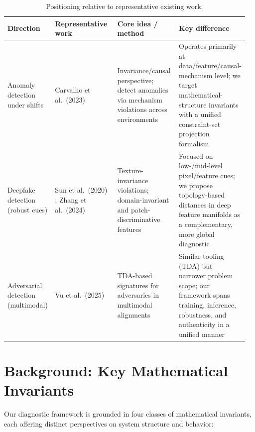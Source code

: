\documentclass[11pt]{article}
\begin{document}
\begin{table}[t]
\centering
\begin{tabular}{@{}p{0.20\linewidth}p{0.30\linewidth}p{0.27\linewidth}p{0.19\linewidth}@{}}
\toprule
\textbf{Direction} & \textbf{Representative work} & \textbf{Core idea / method} & \textbf{Key difference} \\
\midrule
Anomaly detection under shifts
& Carvalho et al.~(2023) \cite{carvalho2023invariant}
& Invariance/causal perspective; detect anomalies via mechanism violations across environments
& Operates primarily at data/feature/causal-mechanism level; we target mathematical-structure invariants with a unified constraint-set projection formalism \\
\addlinespace
Deepfake detection (robust cues)
& Sun et al.~(2020) \cite{sun2020invariant}; Zhang et al.~(2024) \cite{zhang2024domain}
& Texture-invariance violations; domain-invariant and patch-discriminative features
& Focused on low-/mid-level pixel/feature cues; we propose topology-based distances in deep feature manifolds as a complementary, more global diagnostic \\
\addlinespace
Adversarial detection (multimodal)
& Vu et al.~(2025) \cite{vu2025topological}
& TDA-based signatures for adversaries in multimodal alignments
& Similar tooling (TDA) but narrower problem scope; our framework spans training, inference, robustness, and authenticity in a unified manner \\
\bottomrule
\end{tabular}
\caption{Positioning relative to representative existing work.}
\label{tab:rw}
\end{table}

\section{Background: Key Mathematical Invariants}

Our diagnostic framework is grounded in four classes of mathematical invariants, each offering distinct perspectives on system structure and behavior:
\end{document}
